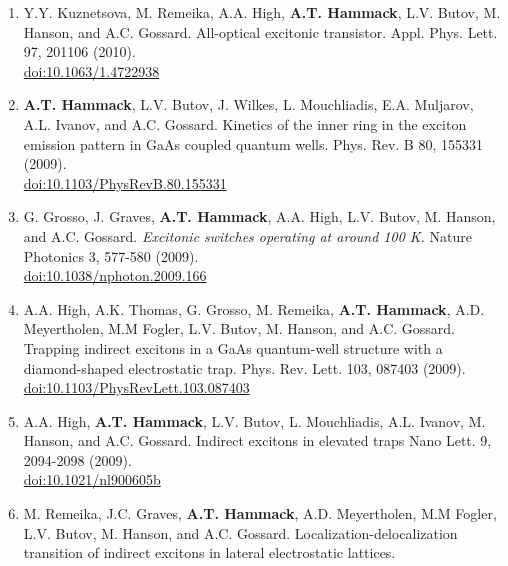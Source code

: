 {\begin{enumerate}[resume]
{        Electrostatic conveyer for excitons.
        Phys. Rev. Lett. 106, 196806 (2011).
        \\ \href{https://doi.org/10.1103/PhysRevLett.106.196806}{doi:10.1103/PhysRevLett.106.196806}
        }
        \item {
        Y.Y. Kuznetsova, M. Remeika, A.A. High, \textbf{A.T. Hammack}, L.V. Butov, M. Hanson, and A.C. Gossard.
        All-optical excitonic transistor.
        Appl. Phys. Lett. 97, 201106 (2010).
        \\ \href{https://doi.org/10.1063/1.4722938}{doi:10.1063/1.4722938}
        }
        \item {
        \textbf{A.T. Hammack}, L.V. Butov, J. Wilkes, L. Mouchliadis, E.A. Muljarov, A.L. Ivanov, and A.C. Gossard.
        Kinetics of the inner ring in the exciton emission pattern in GaAs coupled quantum wells.
        Phys. Rev. B 80, 155331 (2009).
        \\ \href{https://doi.org/10.1103/PhysRevB.80.155331}{doi:10.1103/PhysRevB.80.155331}
        }
        \item {
        G. Grosso, J. Graves, \textbf{A.T. Hammack}, A.A. High, L.V. Butov, M. Hanson, and A.C. Gossard.
        \textit{Excitonic switches operating at around 100 K.}
        Nature Photonics 3, 577-580 (2009).
        \\ \href{https://doi.org/10.1038/nphoton.2009.166}{doi:10.1038/nphoton.2009.166}
        }
        \item {
        A.A. High, A.K. Thomas, G. Grosso, M. Remeika, \textbf{A.T. Hammack}, A.D. Meyertholen, M.M Fogler, L.V. Butov, M. Hanson, and A.C. Gossard.
        Trapping indirect excitons in a GaAs quantum-well structure with a diamond-shaped electrostatic trap.
        Phys. Rev. Lett. 103, 087403 (2009).
        \\ \href{https://doi.org/10.1103/PhysRevLett.103.087403}{doi:10.1103/PhysRevLett.103.087403}
        }
        \item {
        A.A. High, \textbf{A.T. Hammack}, L.V. Butov, L. Mouchliadis, A.L. Ivanov, M. Hanson, and A.C. Gossard.
        Indirect excitons in elevated traps
        Nano Lett. 9, 2094-2098 (2009).
        \\ \href{https://doi.org/10.1021/nl900605b}{doi:10.1021/nl900605b}
        }
        \item {
        M. Remeika, J.C. Graves, \textbf{A.T. Hammack}, A.D. Meyertholen, M.M Fogler, L.V. Butov, M. Hanson, and A.C. Gossard.
        Localization-delocalization transition of indirect excitons in lateral electrostatic lattices.
}
\end{enumerate}}
